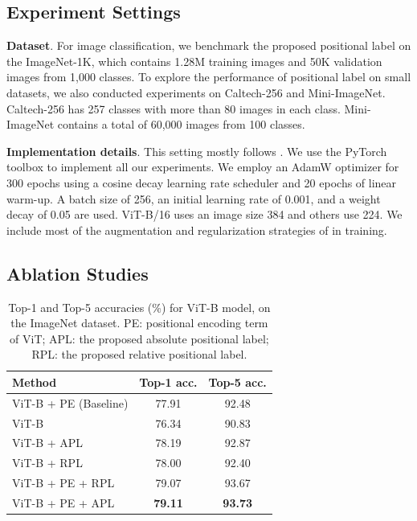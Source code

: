 \documentclass{article}
\begin{document}
\subsection{Experiment Settings}
\noindent \textbf{Dataset}. For image classification, we benchmark the proposed positional label on the ImageNet-1K, which contains 1.28M training images and 50K validation images from 1,000 classes. To explore the performance of positional label on small datasets, we also conducted experiments on Caltech-256 and Mini-ImageNet. Caltech-256 has 257 classes with more than 80 images in each class. Mini-ImageNet contains a total of 60,000 images from 100 classes.

\noindent \textbf{Implementation details}. This setting mostly follows \cite{Liu_2021_ICCV}. We use the PyTorch toolbox \cite{paszke2019pytorch} to implement all our experiments. We employ an AdamW \cite{kingma2014adam} optimizer for 300 epochs using a cosine decay learning rate scheduler and 20 epochs of linear warm-up. A batch size of 256, an initial learning rate of 0.001, and a weight decay of 0.05 are used. ViT-B/16 uses an image size 384 and others use 224. We include most of the augmentation and regularization strategies of \cite{Liu_2021_ICCV} in training.

\subsection{Ablation Studies}
\begin{table}[h]
   \centering
   \caption{Top-1 and Top-5 accuracies (\%) for ViT-B model, on the ImageNet dataset. PE: positional encoding term of ViT; APL: the proposed absolute positional label; RPL: the proposed relative positional label.}
   \begin{tabular}{l|c|c}
      \hline %
      Method                   & Top-1 acc.      & Top-5 acc.      \\
      \hline %
      ViT-B + PE (Baseline)      & 77.91     &92.48      \\
      ViT-B            & 76.34    &90.83      \\
      ViT-B + APL   &   78.19  &92.87\\
      ViT-B + RPL   &   78.00  &92.40\\
      ViT-B + PE + RPL   &   79.07  &93.67\\
     ViT-B + PE + APL  & \textbf{79.11} & \textbf{93.73}\\
      \hline %
   \end{tabular} \\
   \label{ViT-B-YesOrNoPositionCoding}
\end{table}
\end{document}
